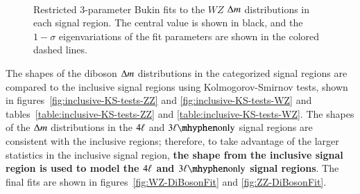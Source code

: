 \begin{figure}[htbp]
{	} \\
	\caption{Restricted 3-parameter Bukin fits to the $WZ$ $\Delta m$ distributions in each signal region. The central value is shown in black, and the $1-\sigma$ eigenvariations of the fit parameters are shown in the colored dashed lines.}
	\label{fig:fit-results-Bukin3Par-WZ}
\end{figure}



The shapes of the diboson $\Delta m$ distributions in the categorized signal regions are compared to the inclusive signal regions using Kolmogorov-Smirnov tests, shown in figures~\ref{fig:inclusive-KS-tests-ZZ} and \ref{fig:inclusive-KS-tests-WZ} and tables~\ref{table:inclusive-KS-tests-ZZ} and \ref{table:inclusive-KS-tests-WZ}. The shapes of the $\Delta m$ distributions in the $4\ell$ and $\threelo$ signal regions are consistent with the inclusive regions; therefore, to take advantage of the larger statistics in the inclusive signal region, \textbf{the shape from the inclusive signal region is used to model the $4\ell$ and $\threelo$ signal regions}. The final fits are shown in figures~\ref{fig:WZ-DiBosonFit} and \ref{fig:ZZ-DiBosonFit}.
 
